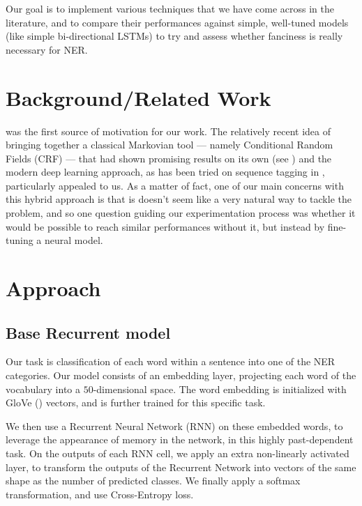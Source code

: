 \documentclass{article} %
\begin{document}
Our goal is to implement various techniques that we have come across in the literature, and to compare their performances against simple, well-tuned models (like simple bi-directional LSTMs) to try and assess whether fanciness is really necessary for NER.

\section{Background/Related Work}

\cite{lample2016neural} was the first source of motivation for our work. The relatively recent idea of bringing together a classical Markovian tool --- namely Conditional Random Fields (CRF) --- that had shown promising results on its own (see \cite{mccallum2003early}) and the modern deep learning approach, as has been tried on sequence tagging in \cite{huang2015bidirectional}, particularly appealed to us. As a matter of fact, one of our main concerns with this hybrid approach is that is doesn't seem like a very natural way to tackle the problem, and so one question guiding our experimentation process was whether it would be possible to reach similar performances without it, but instead by fine-tuning a neural model.




\section{Approach}

\subsection{Base Recurrent model}

Our task is classification of each word within a sentence into one of
the NER categories. Our model consists of an embedding layer, projecting
each word of the vocabulary into a $50$-dimensional space. The word
embedding is initialized with GloVe (\cite{pennington2014glove}) vectors, and is further trained for this specific
task.

We then use a Recurrent Neural Network (RNN) on these embedded words, to
leverage the appearance of memory in the network, in this highly
past-dependent task. On the outputs of each RNN cell, we apply an extra
non-linearly activated layer, to transform the outputs of the Recurrent
Network into vectors of the same shape as the number of predicted
classes. We finally apply a softmax transformation, and use
Cross-Entropy loss.
\end{document}
